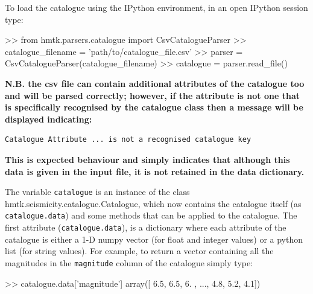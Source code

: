 To load the catalogue using the IPython environment, in an open IPython session type:

\begin{python}
>> from hmtk.parsers.catalogue import CsvCatalogueParser
>> catalogue_filename = 'path/to/catalogue_file.csv'
>> parser = CsvCatalogueParser(catalogue_filename)
>> catalogue = parser.read_file()
\end{python}

\textbf{N.B. the csv file can contain additional attributes of the catalogue too and will be parsed correctly; however, if the attribute is not one that is specifically recognised by the catalogue class then a message will be displayed indicating:}

\begin{Verbatim}[frame=single, commandchars=\\\{\}, fontsize=\scriptsize, samepage=true]
Catalogue Attribute ... is not a recognised catalogue key 
\end{Verbatim}

\textbf{This is expected behaviour and simply indicates that although this data is given in the input file, it is not retained in the data dictionary.}

The variable \verb=catalogue= is an instance of the class hmtk.seismicity.catalogue.Catalogue, which now contains the catalogue itself (as \verb=catalogue.data=) and some methods that can be applied to the catalogue. The first attribute (\verb=catalogue.data=), is a dictionary where each attribute of the catalogue is either a 1-D numpy vector (for float and integer values) or a python list (for string values). For example, to return a vector containing all the magnitudes in the \verb=magnitude= column of the catalogue simply type:

\begin{python}
>> catalogue.data['magnitude']
array([ 6.5,  6.5,  6. , ...,  4.8,  5.2,  4.1])
\end{python}

